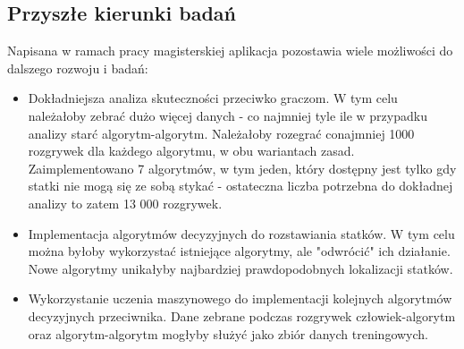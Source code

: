 \subsection{Przyszłe kierunki badań}

Napisana w ramach pracy magisterskiej aplikacja pozostawia wiele możliwości do dalszego rozwoju i badań:
\begin{itemize}
    \item Dokładniejsza analiza skuteczności przeciwko graczom. W tym celu należałoby zebrać dużo więcej danych - co najmniej tyle ile w przypadku analizy starć algorytm-algorytm. Należałoby rozegrać conajmniej 1000 rozgrywek dla każdego algorytmu, w obu wariantach zasad. Zaimplementowano 7 algorytmów, w tym jeden, który dostępny jest tylko gdy statki nie mogą się ze sobą stykać - ostateczna liczba potrzebna do dokładnej analizy to zatem 13 000 rozgrywek.
    \item Implementacja algorytmów decyzyjnych do rozstawiania statków. W tym celu można byłoby wykorzystać istniejące algorytmy, ale "odwrócić" ich działanie. Nowe algorytmy unikałyby najbardziej prawdopodobnych lokalizacji statków.
    \item Wykorzystanie uczenia maszynowego do implementacji kolejnych algorytmów decyzyjnych przeciwnika. Dane zebrane podczas rozgrywek człowiek-algorytm oraz algorytm-algorytm mogłyby służyć jako zbiór danych treningowych. 
\end{itemize}